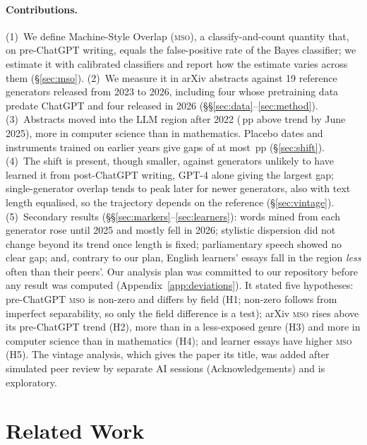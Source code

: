 \documentclass[11pt]{article}
\newcommand{\mso}{\textsc{mso}}
\begin{document}
\paragraph{Contributions.}
(1)~We define Machine-Style Overlap (\mso{}), a classify-and-count quantity \citep{forman2008} that, on
pre-ChatGPT writing, equals the false-positive rate of the Bayes classifier; we estimate it with
calibrated classifiers and report how the estimate varies across them (\S\ref{sec:mso}).
(2)~We measure it in arXiv abstracts against 19 reference generators released from 2023 to 2026, including four
whose pretraining data predate ChatGPT and four released in 2026 (\S\S\ref{sec:data}--\ref{sec:method}).
(3)~Abstracts moved into the LLM region after 2022 (\,pp above trend by June 2025), more in computer science than in mathematics. Placebo dates and instruments trained on earlier years give gaps of at most \,pp (\S\ref{sec:shift}).
(4)~The shift is present, though smaller, against generators unlikely to have learned it from
post-ChatGPT writing, GPT-4 alone giving the largest gap; single-generator overlap tends to peak later for newer generators, also with text length equalised, so the trajectory depends on the reference (\S\ref{sec:vintage}).
(5)~Secondary results (\S\S\ref{sec:markers}--\ref{sec:learners}): words mined from each generator rose until 2025 and mostly fell in 2026; stylistic dispersion did not change beyond its trend once length is fixed; parliamentary speech showed no clear gap; and, contrary to our plan, English learners' essays fall in the region \emph{less} often than their peers'.
Our analysis plan was committed to our repository before any result was computed (Appendix~\ref{app:deviations}). It stated five hypotheses: pre-ChatGPT \mso{} is non-zero and differs by field (H1; non-zero follows from imperfect separability, so only the field difference is a test); arXiv \mso{} rises above its pre-ChatGPT trend (H2), more than in a less-exposed genre (H3) and more in computer science than in mathematics (H4); and learner essays have higher \mso{} (H5). The vintage analysis, which gives the paper its title, was added after simulated peer review by separate AI sessions (Acknowledgements) and is exploratory.

\section{Related Work}
\end{document}
